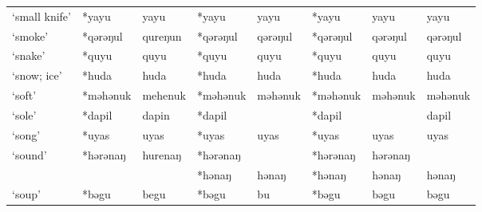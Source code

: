 \begin{landscape}
\begin{longtable}[c]{@{}p{3cm}<{\raggedright}p{2.75cm}<{\raggedright}p{2.75cm}<{\raggedright}p{2.75cm}<{\raggedright}p{2.75cm}<{\raggedright}p{2.75cm}<{\raggedright}p{2.75cm}<{\raggedright}p{2.75cm}<{\raggedright}@{}}
`small knife'                                        & *yayu              & yayu                           & *yayu              & yayu                       & *yayu            & yayu                     & yayu                              \\
`smoke'                                              & *qərəŋul           & qureŋun                        & *qərəŋul           & qərəŋul                    & *qərəŋul         & qərəŋul                  & qərəŋul                           \\
`snake'                                              & *quyu              & quyu                           & *quyu              & quyu                       & *quyu            & quyu                     & quyu                              \\
`snow; ice'                                          & *huda              & huda                           & *huda              & huda                       & *huda            & huda                     & huda                              \\
`soft'                                               & *məhənuk           & mehenuk                        & *məhənuk           & məhənuk                    & *məhənuk         & məhənuk                  & məhənuk                           \\
`sole'                                               & *dapil             & dapin                          & *dapil             &                            & *dapil           &                          & dapil                             \\
`song'                                               & *uyas              & uyas                           & *uyas              & uyas                       & *uyas            & uyas                     & uyas                              \\
`sound'                                              & *hərənaŋ           & hurenaŋ                        & *hərənaŋ           &                            & *hərənaŋ         & hərənaŋ                  &                                   \\
                                                     &                    &                                & *hənaŋ             & hənaŋ                      & *hənaŋ           & hənaŋ                    & hənaŋ                             \\
`soup'                                               & *bəgu              & begu                           & *bəgu              & bu                         & *bəgu            & bəgu                     & bəgu                              \\

\end{longtable}
\end{landscape}

